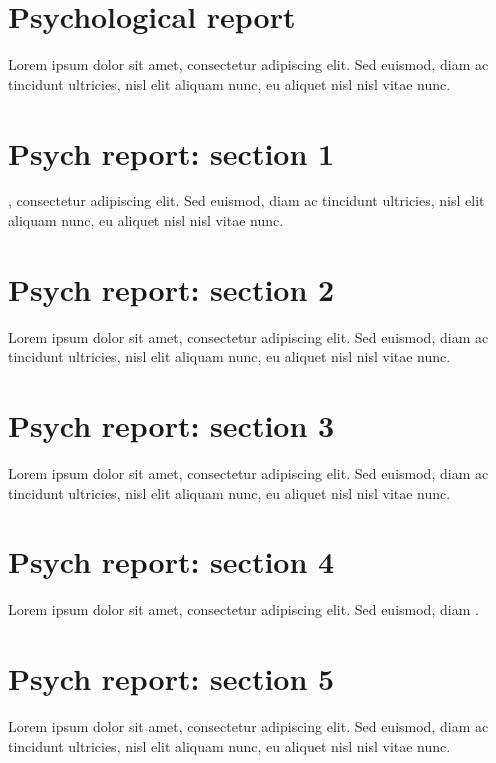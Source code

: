\section{Psychological report}
Lorem ipsum dolor sit amet, consectetur adipiscing elit. Sed euismod, diam ac tincidunt ultricies, nisl elit aliquam nunc, eu aliquet nisl nisl vitae nunc.

\section{Psych report: section 1}

, consectetur adipiscing elit. Sed euismod, diam ac tincidunt ultricies, nisl elit aliquam nunc, eu aliquet nisl nisl vitae nunc.

\section{Psych report: section 2}

Lorem ipsum dolor sit amet, consectetur adipiscing elit. Sed euismod, diam ac tincidunt ultricies, nisl elit aliquam nunc, eu aliquet nisl nisl vitae nunc.

\section{Psych report: section 3}

Lorem ipsum dolor sit amet, consectetur adipiscing elit. Sed euismod, diam ac tincidunt ultricies, nisl elit aliquam nunc, eu aliquet nisl nisl vitae nunc.

\section{Psych report: section 4}

Lorem ipsum dolor sit amet, consectetur adipiscing elit. Sed euismod, diam .

\section{Psych report: section 5}

Lorem ipsum dolor sit amet, consectetur adipiscing elit. Sed euismod, diam ac tincidunt ultricies, nisl elit aliquam nunc, eu aliquet nisl nisl vitae nunc.

